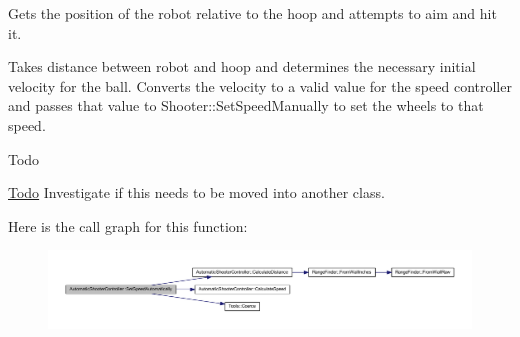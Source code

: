 \-Gets the position of the robot relative to the hoop and attempts to aim and hit it. 

\-Takes distance between robot and hoop and determines the necessary initial velocity for the ball. \-Converts the velocity to a valid value for the speed controller and passes that value to \-Shooter\-::\-Set\-Speed\-Manually to set the wheels to that speed.

\begin{DoxyRefDesc}{\-Todo}
\item[\hyperlink{todo__todo000006}{\-Todo}]\-Investigate if this needs to be moved into another class. \end{DoxyRefDesc}


\-Here is the call graph for this function\-:\nopagebreak
\begin{figure}[H]
\begin{center}
\leavevmode
\includegraphics[width=350pt]{class_automatic_shooter_controller_ade48e6198578a2f8234fb9cac9b9dc31_cgraph}
\end{center}
\end{figure}




